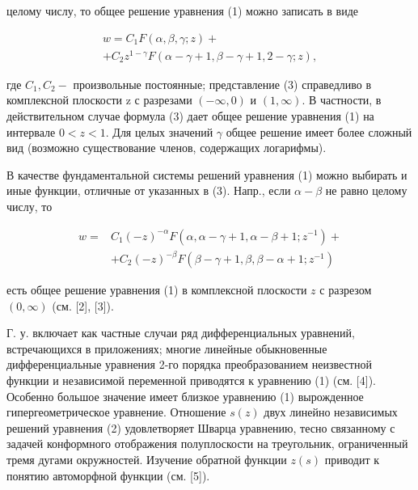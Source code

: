 \documentclass[10pt]{article}
\begin{document}
целому числу, то общее решение уравнения (1) можно записать в виде



\[

\begin{gathered}

w=C_{1} F(\alpha, \beta, \gamma ; z)+ \\

+C_{2} z^{1-\gamma} F(\alpha-\gamma+1, \beta-\gamma+1,2-\gamma ; z),

\end{gathered}

\]



где $C_{1}, C_{2}-$ произвольные постоянные; представление (3) справедливо в комплексной плоскости z с разрезами $(-\infty, 0)$ и $(1, \infty)$. В частности, в действительном случае формула (3) дает общее решение уравнения (1) на интервале $0<z<1$. Для целых значений $\gamma$ общее решение имеет более сложный вид (возможно существование членов, содержащих логарифмы).



В качестве фундаментальной системы решений уравнения (1) можно выбирать и иные функции, отличные от указанных в (3). Напр., если $\alpha-\beta$ не равно целому числу, то



\[

\begin{aligned}

w= & C_{1}(-z)^{-\alpha} F\left(\alpha, \alpha-\gamma+1, \alpha-\beta+1 ; z^{-1}\right)+ \\

& +C_{2}(-z)^{-\beta} F\left(\beta-\gamma+1, \beta, \beta-\alpha+1 ; z^{-1}\right)

\end{aligned}

\]



есть общее решение уравнения (1) в комплексной плоскости $z$ с разрезом $(0, \infty)$ (см. [2], [3]).



Г. у. включает как частные случаи ряд дифференциальных уравнений, встречающихся в приложениях; многие линейные обыкновенные дифференциальные уравнения 2-го порядка преобразованием неизвестной функции и независимой переменной приводятся к уравнению (1) (см. [4]). Особенно большое значение имеет близкое уравнению (1) вырожденное гипергеометрическое уравнение. Отношение $s(z)$ двух линейно независимых решений уравнения (2) удовлетворяет Шварца уравнению, тесно связанному с задачей конформного отображения полуплоскости на треугольник, ограниченный тремя дугами окружностей. Изучение обратной функции $z(s)$ приводит к понятию автоморфной функции (см. [5]).
\end{document}
